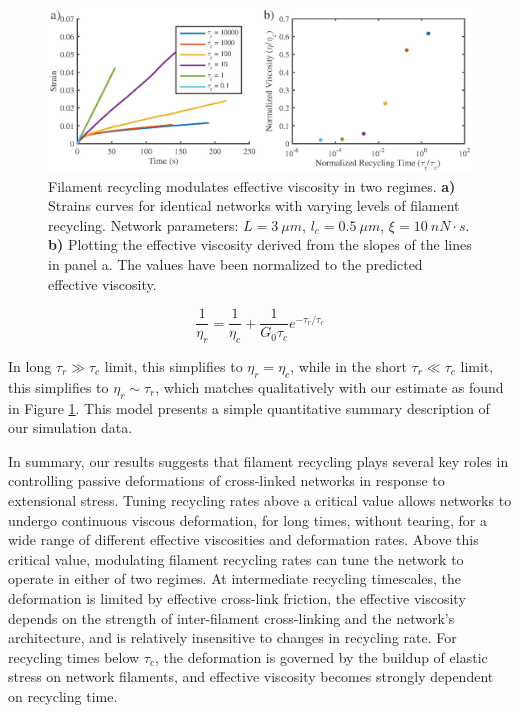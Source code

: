 \documentclass[10pt,letterpaper]{article}
\begin{document}
\begin{figure}[h!]
\centering
\includegraphics[width=\hsize]{figures/figure5a2}
\caption{\label{fig:passive_rec2}  Filament recycling modulates effective viscosity in two regimes.  \textbf{a)} Strains curves for identical networks with varying levels of filament recycling.  Network parameters: $L=3\: \mu m$, $l_c=0.5\: \mu m$, $\xi=10\: nN\cdot s$. \textbf{b)}  Plotting the effective viscosity derived from the slopes of the lines in panel a. The values have been normalized to the predicted effective viscosity. }
\end{figure}

\begin{equation}
\frac{1}{\eta_r} = \frac{1}{\eta_c}  + \frac{1}{G_0\tau_c}e^{-\tau_r/\tau_c}
\end{equation}

In long $\tau_r\gg\tau_c$ limit, this simplifies to $\eta_r=\eta_c$, while in the short $\tau_r\ll\tau_c$ limit, this simplifies to $\eta_r\sim\tau_r$, which matches qualitatively with our estimate as found in Figure \ref{fig:passive_rec2}.  This model presents a simple quantitative summary description of our simulation data.



In summary, our results suggests that filament recycling plays several key roles in controlling passive deformations of cross-linked networks in response to extensional stress.  Tuning recycling rates above a critical value allows networks to undergo continuous viscous deformation, for long times, without tearing, for a wide range of different effective viscosities and deformation rates. Above this critical value, modulating filament recycling rates can tune the network to operate in either of two regimes.  At intermediate recycling timescales, the deformation is limited by effective cross-link friction, the effective viscosity depends on the strength of inter-filament cross-linking and the network's architecture, and is relatively insensitive to changes in recycling rate. For recycling times below $\tau_c$, the deformation is governed by the buildup of elastic stress on network filaments, and effective viscosity becomes strongly dependent on recycling time. 
\end{document}
